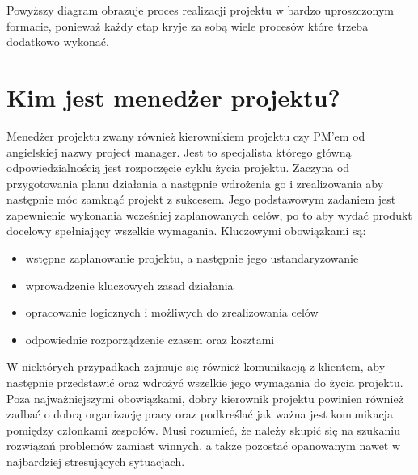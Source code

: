 \documentclass[oneside,polski,logo]{amuthesis}
\begin{document}
Powyższy diagram obrazuje proces realizacji projektu w bardzo uproszczonym formacie, ponieważ każdy etap kryje za sobą wiele procesów które trzeba dodatkowo wykonać.\\
\section {Kim jest menedżer projektu?}
Menedżer projektu zwany również kierownikiem projektu czy PM’em od angielskiej nazwy project manager. Jest to specjalista którego główną odpowiedzialnością jest rozpoczęcie cyklu życia projektu. Zaczyna od przygotowania planu działania a następnie wdrożenia go i zrealizowania aby następnie móc zamknąć projekt z sukcesem. Jego podstawowym zadaniem jest zapewnienie wykonania wcześniej zaplanowanych celów, po to aby wydać produkt docelowy spełniający wszelkie wymagania. Kluczowymi obowiązkami są:\\

\begin{itemize}
	\item wstępne zaplanowanie projektu, a następnie jego ustandaryzowanie
	\item wprowadzenie kluczowych zasad działania
	\item opracowanie logicznych i możliwych do zrealizowania celów
	\item odpowiednie rozporządzenie czasem oraz kosztami \\
\end{itemize}

W niektórych przypadkach zajmuje się również komunikacją z klientem, aby następnie przedstawić oraz wdrożyć wszelkie jego wymagania do życia projektu. Poza najważniejszymi obowiązkami, dobry kierownik projektu powinien również zadbać o dobrą organizację pracy oraz podkreślać jak ważna jest komunikacja pomiędzy członkami zespołów. Musi rozumieć, że należy skupić się na szukaniu rozwiązań problemów zamiast winnych, a także pozostać opanowanym nawet w najbardziej stresujących sytuacjach.
\end{document}
